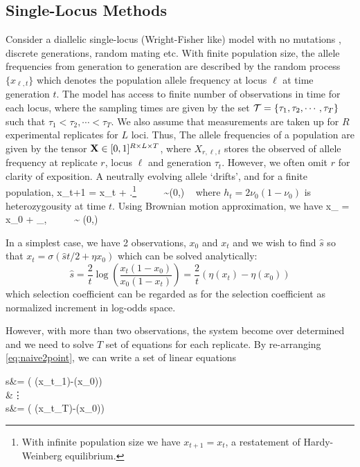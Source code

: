 \documentclass[11pt]{article}
\begin{document}
\subsection{Single-Locus Methods}
Consider a diallelic single-locus (Wright-Fisher like) model with no
mutations \cite{Ewens2012Mathematical}, discrete generations, random
mating etc. With finite population size, the allele frequencies from
generation to generation are described by the random process
$\{x_{\ell,t}\}$ which denotes the population allele frequency at
locus $\ell$ at time generation $t$. The model has access to finite
number of observations in time for each locus, where the sampling
times are given by the set ${\cal T}=\{\tau_1,\tau_2,\cdots, \tau_T \}$
such that $\tau_1<\tau_2,\cdots<\tau_T$. We also assume that
measurements are taken up for $R$ experimental replicates for $L$
loci. Thus, The allele frequencies of a population are given by the
tensor ${\mathbf X} \in [0,1]^{R \times L \times T}$, where $X_{r,\ell,t}$
stores the observed of allele frequency at replicate $r$, locus $\ell$
and generation $\tau_t$. However, we often omit $r$ for clarity of
exposition. A neutrally evolving allele `drifts', and for a finite
population,
\beq x_{t+1} = x_t + \epsilon\; .\footnote{With infinite population size
	we have $x_{t+1} = x_t$, a restatement of Hardy-Weinberg
	equilibrium.} \ \ \ \ \ \epsilon \sim \Nc(0,)  \
\label{eq:drift}
\eeq
where $h_t=2\nu_0(1-\nu_0)$ is heterozygousity at time $t$.
Using Brownian motion approximation, we have 
\beq x_{\tau} = x_0 + \epsilon_\tau,  \ \ \ \ \ \epsilon \sim 
\Nc(0,)
\eeq

In a simplest case, we have 2 observations, $x_0$ and $x_t$ and we wish to find 
$\hat{s}$ so that $x_t=\sigma(\hat{s}t/2+\eta{x_0})$ which can be solved 
analytically:
\begin{equation}
\hat{s}=\frac{2}{t} \log \left( \frac{x_t(1-x_0)}{x_0 (1-x_t)} \right) = 
\frac{2}{t}  \left( \eta(x_t)-\eta(x_0)\right)
\label{eq:naive2point}
\end{equation}
which selection coefficient can be regarded as for the
selection coefficient as normalized increment in log-odds space.

However, with more than two observations, the system become over determined and 
we need to solve $T$ set of equations for each replicate. By re-arranging 
\eqref{eq:naive2point}, we can write a set of linear equations

\beq
{} s&=  \left( \eta(x_{t_1})-\eta(x_0)\right)\\
&\vdots\\
s&= \left( \eta(x_{t_T})-\eta(x_0)\right)\\
\eeq
\end{document}
